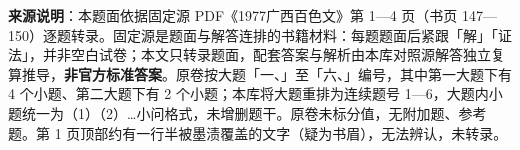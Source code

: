 


\begin{gktip}
\textbf{来源说明}：本题面依据固定源 PDF《1977广西百色文》第 1—4 页（书页 147—150）逐题转录。固定源是题面与解答连排的书籍材料：每题题面后紧跟「解」「证法」，并非空白试卷；本文只转录题面，配套答案与解析由本库对照源解答独立复算推导，\textbf{非官方标准答案}。原卷按大题「一、」至「六、」编号，其中第一大题下有 4 个小题、第二大题下有 2 个小题；本库将大题重排为连续题号 1—6，大题内小题统一为（1）（2）…小问格式，未增删题干。原卷未标分值，无附加题、参考题。第 1 页顶部约有一行半被墨渍覆盖的文字（疑为书眉），无法辨认，未转录。
\end{gktip}

\par\medskip


